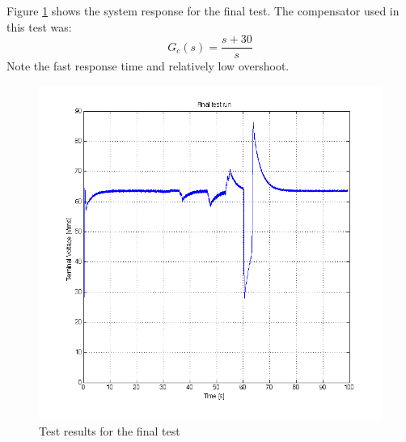 Figure \ref{fig:final_test} shows the system response for the final test. The compensator used in this test was:
\begin{equation}
G_c(s) = \frac{s + 30}{s}
\end{equation}
Note the fast response time and relatively low overshoot.

\begin{figure}[h!]
\begin{center}
\includegraphics[scale=0.6]{./img/data_final.png}
\end{center}
\caption{Test results for the final test}
\label{fig:final_test}
\end{figure}


